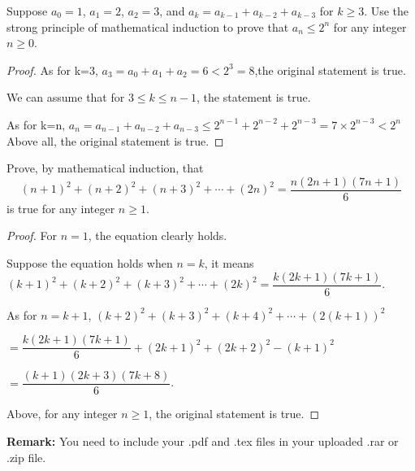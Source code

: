 \documentclass[12pt,a4paper]{article}
\theoremstyle{definition}
\begin{document}
\begin{enumerate}
    \item
    Suppose $a_0=1$, $a_1=2$, $a_2=3$, and $a_k=a_{k-1}+a_{k-2}+a_{k-3}$ for $k \ge 3$. Use the strong principle of mathematical induction to prove that $a_n \le 2^n$ for any integer $n\ge 0$.
    \begin{proof}
        As for k=3, $a_3=a_0+a_1+a_2=6 < 2^3 = 8$,the original statement is true.\item
        We can assume that for $3\le k\le n-1$, the statement is true.\item
        As for k=n, $a_n=a_{n-1}+a_{n-2}+a_{n-3}\le 2^{n-1}+2^{n-2}+2^{n-3}=7\times 2^{n-3}<2^n$ 
        Above all, the original statement is true.
    \end{proof}

    \item
    Prove, by mathematical induction, that
    $$
    (n+1)^2+(n+2)^2+(n+3)^2+\cdots +(2n)^2=\dfrac{n(2n+1)(7n+1)}{6}
    $$
    is true for any integer $n\ge 1$.
    \begin{proof}
        For $n=1$, the equation clearly holds.\item
        Suppose the equation holds when $n=k$, it means $(k+1)^2+(k+2)^2+(k+3)^2+\cdots +(2k)^2=\dfrac{k(2k+1)(7k+1)}{6}$. \item
        As for $n=k+1$, $(k+2)^2+(k+3)^2+(k+4)^2+\cdots +(2(k+1))^2$\item$=\dfrac{k(2k+1)(7k+1)}{6}+(2k+1)^2+(2k+2)^2-(k+1)^2$\item$=\dfrac{(k+1)(2k+3)(7k+8)}{6}$.\item
        Above, for any integer $n\ge 1$, the original statement is true.
    \end{proof}

\end{enumerate}

\vspace{20pt}

\textbf{Remark:} You need to include your .pdf and .tex files in your uploaded .rar or .zip file.

\end{document}

